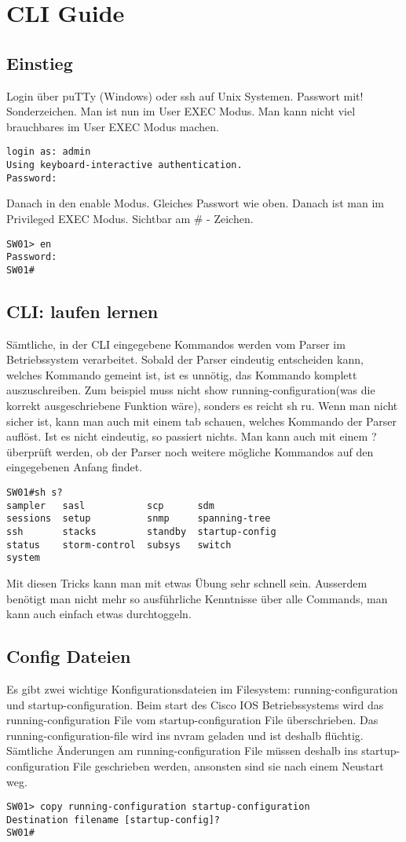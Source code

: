 \chapter{CLI Guide}
\section{Einstieg}
Login über puTTy (Windows) oder ssh auf Unix Systemen. Passwort mit! Sonderzeichen. Man ist nun im User EXEC Modus. Man kann nicht viel brauchbares im User EXEC Modus machen.
\begin{lstlisting}[language=CISCO] 
login as: admin 
Using keyboard-interactive authentication.
Password: 
\end{lstlisting}
Danach in den enable Modus. Gleiches Passwort wie oben. Danach ist man im Privileged EXEC Modus. Sichtbar am \# - Zeichen.
\begin{lstlisting}[language=CISCO] 
SW01> en 
Password: 
SW01#
\end{lstlisting}

\section{CLI: laufen lernen}
Sämtliche, in der CLI eingegebene Kommandos werden vom Parser im Betriebssystem verarbeitet. Sobald der Parser eindeutig entscheiden kann, welches Kommando gemeint ist, ist es unnötig, das Kommando komplett auszuschreiben. Zum beispiel muss nicht \glqq show running-configuration\grqq (was die korrekt ausgeschriebene Funktion wäre), sonders es reicht \glqq sh ru\grqq . Wenn man nicht sicher ist, kann man auch mit einem tab schauen, welches Kommando der Parser auflöst. Ist es nicht eindeutig, so passiert nichts. Man kann auch mit einem \glqq ?\grqq überprüft werden, ob der Parser noch weitere mögliche Kommandos auf den eingegebenen Anfang findet.
\begin{lstlisting}[language=CISCO] 
SW01#sh s?
sampler   sasl           scp      sdm
sessions  setup          snmp     spanning-tree
ssh       stacks         standby  startup-config
status    storm-control  subsys   switch
system
\end{lstlisting}
Mit diesen Tricks kann man mit etwas Übung sehr schnell sein. Ausserdem benötigt man nicht mehr so ausführliche Kenntnisse über alle Commands, man kann auch einfach etwas durchtoggeln.

\section{Config Dateien}
Es gibt zwei wichtige Konfigurationsdateien im Filesystem: running-configuration und startup-configuration. Beim start des Cisco IOS Betriebssystems wird das running-configuration File vom startup-configuration File überschrieben. Das running-configuration-file wird ins nvram geladen und ist deshalb flüchtig. Sämtliche Änderungen am running-configuration File müssen deshalb ins startup-configuration File geschrieben werden, ansonsten sind sie nach einem Neustart weg.
\begin{lstlisting}[language=CISCO] 
SW01> copy running-configuration startup-configuration
Destination filename [startup-config]?
SW01#
\end{lstlisting}

